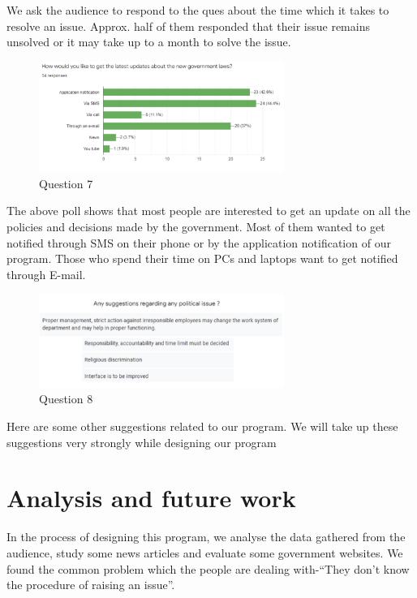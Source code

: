 \documentclass[acmtog]{acmart}
\begin{document}
We ask the audience to respond to the ques about the time which it takes to resolve an issue. Approx. half of them responded that their issue remains unsolved or it may take up to a month to solve the issue.

\begin{figure}[H]
    \includegraphics[width=8cm]{Resources/q7}
    \caption{Question 7}
    \label{fig:q7}
\end{figure}

The above poll shows that most people are interested to get an update on all the policies and decisions made by the government. Most of them wanted to get notified through SMS on their phone or by the application notification of our program. Those who spend their time on PCs and laptops want to get notified through E-mail.

\begin{figure}[H]
    \includegraphics[width=8cm]{Resources/q8}
    \caption{Question 8}
    \label{fig:q8}
\end{figure}

Here are some other suggestions related to our program. We will take up these suggestions very strongly while designing our program



\section*{Analysis and future work}
In the process of designing this program, we analyse the data gathered from the audience, study some news articles and evaluate some government websites. We found the common problem which the people are dealing with-“They don’t know the procedure of raising an issue”.
\end{document}

